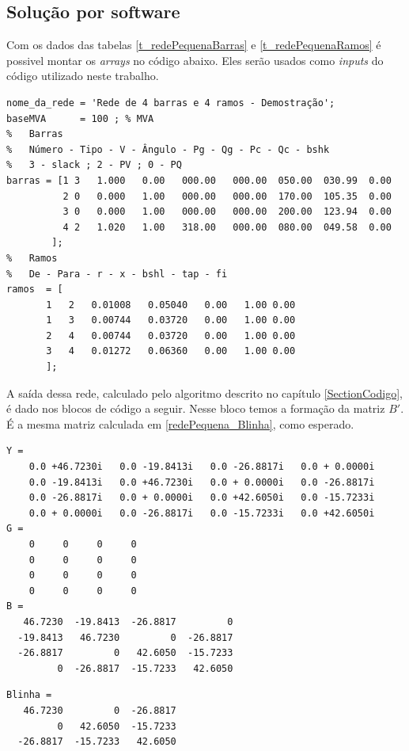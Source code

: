 \subsection{Solução por software}
\label{SubsectionSolucaoRedePequenaLinearizado}
Com os dados das tabelas \ref{t_redePequenaBarras} e \ref{t_redePequenaRamos} é possivel montar os \textit{arrays} no código abaixo. Eles serão usados como \textit{inputs} do código utilizado neste trabalho. 
\begin{verbatim}
nome_da_rede = 'Rede de 4 barras e 4 ramos - Demostração';
baseMVA      = 100 ; % MVA
%   Barras
%	Número - Tipo - V - Ângulo - Pg - Qg - Pc - Qc - bshk
%	3 - slack ; 2 - PV ; 0 - PQ
barras = [1 3   1.000   0.00   000.00   000.00  050.00  030.99  0.00
          2 0   0.000   1.00   000.00   000.00  170.00  105.35  0.00
          3 0   0.000   1.00   000.00   000.00  200.00  123.94  0.00
          4 2   1.020   1.00   318.00   000.00  080.00  049.58  0.00
        ];
%   Ramos
%	De - Para - r - x - bshl - tap - fi
ramos  = [
       1   2   0.01008   0.05040   0.00   1.00 0.00
       1   3   0.00744   0.03720   0.00   1.00 0.00
       2   4   0.00744   0.03720   0.00   1.00 0.00
       3   4   0.01272   0.06360   0.00   1.00 0.00
       ];
\end{verbatim}
A saída dessa rede, calculado pelo algoritmo descrito no capítulo \ref{SectionCodigo}, é dado nos blocos de código a seguir.
Nesse bloco temos a formação da matriz $B'$. É a mesma matriz calculada em \ref{redePequena_Blinha}, como esperado.
\begin{verbatim}
Y =
    0.0 +46.7230i   0.0 -19.8413i   0.0 -26.8817i   0.0 + 0.0000i
    0.0 -19.8413i   0.0 +46.7230i   0.0 + 0.0000i   0.0 -26.8817i
    0.0 -26.8817i   0.0 + 0.0000i   0.0 +42.6050i   0.0 -15.7233i
    0.0 + 0.0000i   0.0 -26.8817i   0.0 -15.7233i   0.0 +42.6050i
G =
    0     0     0     0
    0     0     0     0
    0     0     0     0
    0     0     0     0
B =
   46.7230  -19.8413  -26.8817         0
  -19.8413   46.7230         0  -26.8817
  -26.8817         0   42.6050  -15.7233
         0  -26.8817  -15.7233   42.6050
\end{verbatim}
\begin{verbatim}
Blinha =
   46.7230         0  -26.8817
         0   42.6050  -15.7233
  -26.8817  -15.7233   42.6050
\end{verbatim}
